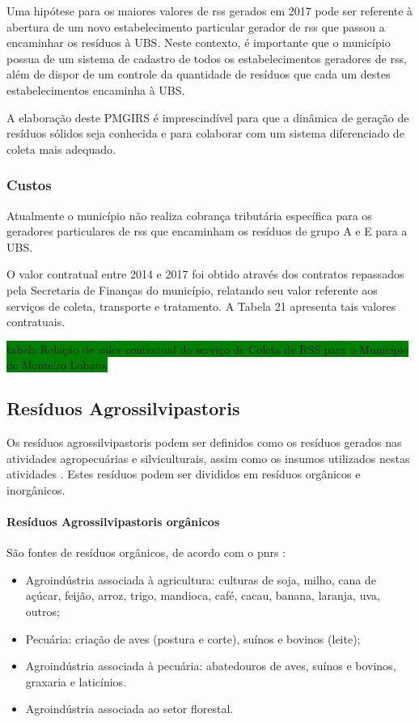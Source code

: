 	Uma hipótese para os maiores valores de \gls{rss} gerados em 2017 pode ser referente à abertura de um novo estabelecimento particular gerador de \gls{rss} que passou a encaminhar os resíduos à UBS. Neste contexto, é importante que o município possua de um sistema de cadastro de todos os estabelecimentos geradores de \gls{rss}, além de dispor de um controle da quantidade de resíduos que cada um destes estabelecimentos encaminha à UBS. 
	
	A elaboração deste PMGIRS é imprescindível para que a dinâmica de geração de resíduos sólidos seja conhecida e para colaborar com um sistema diferenciado de coleta mais adequado.
	
	\subsubsection{Custos}
	Atualmente o município não realiza cobrança tributária específica para os geradores particulares de \gls{rss} que encaminham os resíduos de grupo A e E para a UBS.

	O valor contratual entre 2014 e 2017 foi obtido através dos contratos repassados pela Secretaria de Finanças do município, relatando seu valor referente aos serviços de coleta, transporte e tratamento. A Tabela 21 apresenta tais valores contratuais.
	
	\colorbox{green}{tabela:Relação de valor contratual do serviço de Coleta de RSS para o Município de Monteiro Lobato.}
	
	\subsection{Resíduos Agrossilvipastoris}
	Os resíduos agrossilvipastoris podem ser definidos como os resíduos gerados nas atividades agropecuárias e silviculturais, assim como os insumos utilizados nestas atividades \cite{brasil:12305}. Estes resíduos podem ser divididos em resíduos orgânicos e inorgânicos.
	
	\paragraph{\textbf{Resíduos Agrossilvipastoris orgânicos}}
	São fontes de resíduos orgânicos, de acordo com o \gls{pnrs} \cite{MMA2012}:
	
	\begin{itemize}
		\item Agroindústria associada à agricultura: culturas de soja, milho, cana de açúcar, feijão, arroz, trigo, mandioca, café, cacau, banana, laranja, uva, outros;
		\item Pecuária: criação de aves (postura e corte), suínos e bovinos (leite);
		\item Agroindústria associada à pecuária: abatedouros de aves, suínos e bovinos, graxaria e laticínios.
		\item Agroindústria associada ao setor florestal.
	\end{itemize}
	
